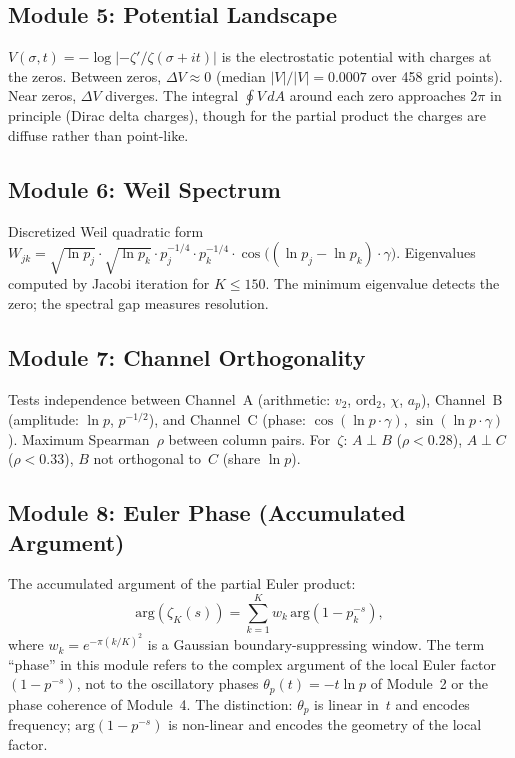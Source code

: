 \documentclass[11pt]{amsart}
\begin{document}
\subsection{Module 5: Potential Landscape}

$V(\sigma,t) = -\log\lvert -\zeta'/\zeta(\sigma+it)\rvert$ is the
electrostatic potential with charges at the zeros. Between zeros,
$\Delta V \approx 0$ (median $|V|/|V| = 0.0007$ over 458 grid points). Near
zeros, $\Delta V$ diverges. The integral $\oint V\,dA$ around each zero
approaches $2\pi$ in principle (Dirac delta charges), though for the partial
product the charges are diffuse rather than point-like.

\subsection{Module 6: Weil Spectrum}

Discretized Weil quadratic form
$W_{jk} = \sqrt{\ln p_j}\cdot\sqrt{\ln p_k}\cdot p_j^{-1/4}\cdot
p_k^{-1/4}\cdot\cos\bigl((\ln p_j - \ln p_k)\cdot\gamma\bigr)$.
Eigenvalues computed by Jacobi iteration for $K \le 150$. The minimum
eigenvalue detects the zero; the spectral gap measures resolution.

\subsection{Module 7: Channel Orthogonality}

Tests independence between Channel~A (arithmetic: $v_2$, $\mathrm{ord}_2$,
$\chi$, $a_p$), Channel~B (amplitude: $\ln p$, $p^{-1/2}$), and Channel~C
(phase: $\cos(\ln p \cdot \gamma)$, $\sin(\ln p \cdot \gamma)$). Maximum
Spearman~$\rho$ between column pairs. For~$\zeta$: $A\perp B$
($\rho < 0.28$), $A\perp C$ ($\rho < 0.33$), $B$ not orthogonal to~$C$
(share $\ln p$).

\subsection{Module 8: Euler Phase (Accumulated Argument)}

The accumulated argument of the partial Euler product:
\[
  \mathrm{arg}(\zeta_K(s))
    = \sum_{k=1}^{K} w_k\,\mathrm{arg}(1 - p_k^{-s}),
\]
where $w_k = e^{-\pi(k/K)^2}$ is a Gaussian boundary-suppressing window.
The term ``phase'' in this module refers to the complex argument of the
local Euler factor $(1-p^{-s})$, not to the oscillatory phases
$\theta_p(t) = -t\ln p$ of Module~2 or the phase coherence of Module~4.
The distinction: $\theta_p$ is linear in~$t$ and encodes frequency;
$\mathrm{arg}(1-p^{-s})$ is non-linear and encodes the geometry of the
local factor.
\end{document}

